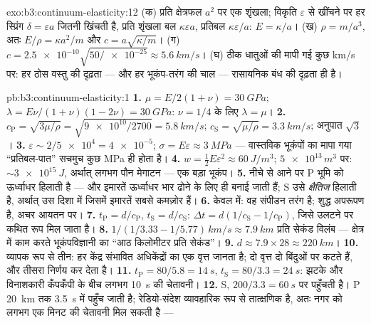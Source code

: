 \begin{solution}{exo:b3:continuum-elasticity:12}
(क) प्रति क्षेत्रफल $a^2$ पर एक शृंखला; विकृति $\varepsilon$ से खींचने
पर हर स्प्रिंग $\delta = \varepsilon a$ जितनी खिंचती है, प्रति शृंखला
बल $\kappa
\varepsilon a$, प्रतिबल $\kappa\varepsilon/a$: $E =
\kappa/a$। (ख) $\rho = m/a^3$, अतः $E/\rho = \kappa a^2/m$ और $c =
a\sqrt{\kappa/m}$। (ग) $c = \num{2.5e-10}\sqrt{50/\num{e-25}} \approx
\qty{5.6}{km/s}$। (घ) ठीक धातुओं की मापी गई कुछ km/s पर: हर ठोस वस्तु
की दृढ़ता --- और हर भूकंप-तरंग की चाल --- रासायनिक बंध की दृढ़ता ही है।
\end{solution}

\begin{solution}{pb:b3:continuum-elasticity:1}
\textbf{1.} $\mu = E/2(1+\nu) = \qty{30}{GPa}$; $\lambda =
E\nu/(1+\nu)(1-2\nu) = \qty{30}{GPa}$: $\nu = 1/4$ के लिए $\lambda =
\mu$।
\textbf{2.} $c_{\text{P}} = \sqrt{3\mu/\rho} = \sqrt{\num{9e10}/2700}
= \qty{5.8}{km/s}$; $c_{\text{S}} = \sqrt{\mu/\rho} =
\qty{3.3}{km/s}$; अनुपात $\sqrt3$।
\textbf{3.} $\varepsilon \sim 2/\num{5e4} = \num{4e-5}$; $\sigma =
E\varepsilon \approx \qty{3}{MPa}$ --- वास्तविक भूकंपों का मापा गया
``प्रतिबल-पात'' सचमुच कुछ MPa ही होता है।
\textbf{4.} $w = \tfrac12 E\varepsilon^2 \approx \qty{60}{J/m^3}$;
$\num{5e13}{}\,\unit{m^3}$ पर: $\sim\qty{3e15}{J}$, अर्थात् लगभग
पौन मेगाटन --- एक बड़ा भूकंप।
\textbf{5.} नीचे से आने पर P भूमि को ऊर्ध्वाधर हिलाती है --- और इमारतें
ऊर्ध्वाधर भार ढोने के लिए ही बनाई जाती हैं; S उसे \emph{क्षैतिज}
हिलाती है, अर्थात् उस दिशा में जिसमें इमारतें सबसे कमज़ोर हैं।
\textbf{6.} केवल  में: वह संपीडन तरंग है; 
शुद्ध अपरूपण है, अचर आयतन पर।
\textbf{7.} $t_{\text{P}} = d/c_{\text{P}}$, $t_{\text{S}} =
d/c_{\text{S}}$: $\Delta t = d(1/c_{\text{S}} - 1/c_{\text{P}})$,
जिसे उलटने पर कथित रूप मिल जाता है।
\textbf{8.} $1/(1/3.33 - 1/5.77)\,\unit{km/s} \approx
\qty{7.9}{km}$ प्रति सेकंड विलंब --- क्षेत्र में काम करते भूकंपविज्ञानी
का ``आठ किलोमीटर प्रति सेकंड''।
\textbf{9.} $d \approx 7.9 \times 28 \approx \qty{220}{km}$।
\textbf{10.} व्यापक रूप से तीन: हर केंद्र संभावित अधिकेंद्रों का एक
वृत्त जानता है; दो वृत्त दो बिंदुओं पर कटते हैं, और तीसरा निर्णय कर
देता है।
\textbf{11.} $t_{\text{P}} = 80/5.8 = \qty{14}{s}$, $t_{\text{S}} =
80/3.3 = \qty{24}{s}$: झटके और विनाशकारी कँपकँपी के बीच लगभग
\qty{10}{s} की चेतावनी।
\textbf{12.} S, $200/3.3 = \qty{60}{s}$ पर पहुँचती है। P
\qty{20}{km} तक \qty{3.5}{s} में पहुँच जाती है; रेडियो-संदेश व्यावहारिक
रूप से तात्क्षणिक है, अतः नगर को लगभग एक मिनट की चेतावनी मिल सकती है ---

\end{solution}

